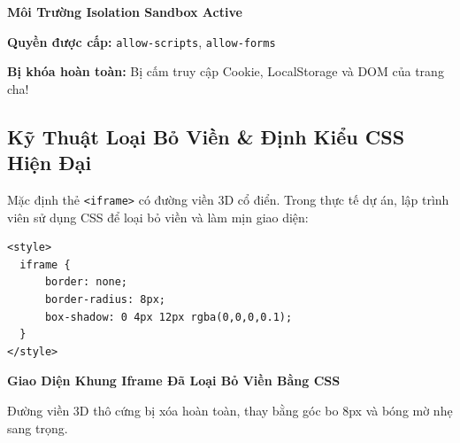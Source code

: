 \documentclass[11pt,oneside]{book}
\newcommand{\codeinline}[1]{\textcolor{accentOrange}{\texttt{#1}}}
\begin{document}
\begin{browserWindow}[https://example.com (sandbox="allow-scripts allow-forms")]
\centering\sffamily\vspace{4pt}
{\bfseries\color{accentOrange}\large Môi Trường Isolation Sandbox Active} \par\vspace{6pt}
\small\textbf{Quyền được cấp:} \codeinline{allow-scripts}, \codeinline{allow-forms} \par\vspace{4pt}
\small\textcolor{warnBorder}{\textbf{Bị khóa hoàn toàn:}} Bị cấm truy cập Cookie, LocalStorage và DOM của trang cha! \par\vspace{4pt}
\end{browserWindow}

\subsection{Kỹ Thuật Loại Bỏ Viền \& Định Kiểu CSS Hiện Đại}

Mặc định thẻ \codeinline{<iframe>} có đường viền 3D cổ điển. Trong thực tế dự án, lập trình viên sử dụng CSS để loại bỏ viền và làm mịn giao diện:

\begin{codeWindow}
\begin{lstlisting}[language=HTML5]
<style>
  iframe {
      border: none;
      border-radius: 8px;
      box-shadow: 0 4px 12px rgba(0,0,0,0.1);
  }
</style>
\end{lstlisting}
\end{codeWindow}

\begin{browserWindow}[https://example.com (style="border: none; border-radius: 8px;")]
\centering\sffamily\vspace{4pt}
{\bfseries\color{tipBorder}\large Giao Diện Khung Iframe Đã Loại Bỏ Viền Bằng CSS} \par\vspace{6pt}
\small\color{darkText} Đường viền 3D thô cứng bị xóa hoàn toàn, thay bằng góc bo 8px và bóng mờ nhẹ sang trọng. \par\vspace{4pt}
\end{browserWindow}

\end{document}
